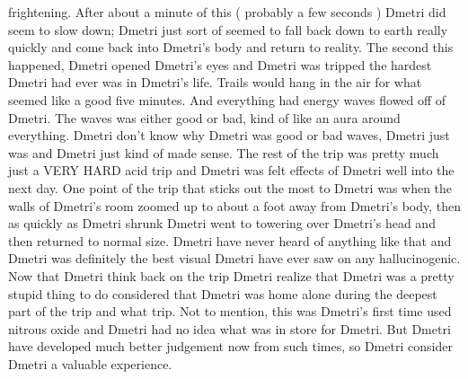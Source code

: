 \documentclass[12pt]{book}
\begin{document}
frightening. After about a minute of this ( probably a few seconds ) Dmetri did seem to slow down; Dmetri just sort of seemed to fall back down to earth really quickly and come back into Dmetri's body and return to reality. The second this happened, Dmetri opened Dmetri's eyes and Dmetri was tripped the hardest Dmetri had ever was in Dmetri's life. Trails would hang in the air for what seemed like a good five minutes. And everything had energy waves flowed off of Dmetri. The waves was either good or bad, kind of like an aura around everything. Dmetri don't know why Dmetri was good or bad waves, Dmetri just was and Dmetri just kind of made sense. The rest of the trip was pretty much just a VERY HARD acid trip and Dmetri was felt effects of Dmetri well into the next day. One point of the trip that sticks out the most to Dmetri was when the walls of Dmetri's room zoomed up to about a foot away from Dmetri's body, then as quickly as Dmetri shrunk Dmetri went to towering over Dmetri's head and then returned to normal size. Dmetri have never heard of anything like that and Dmetri was definitely the best visual Dmetri have ever saw on any hallucinogenic. Now that Dmetri think back on the trip Dmetri realize that Dmetri was a pretty stupid thing to do considered that Dmetri was home alone during the deepest part of the trip and what trip. Not to mention, this was Dmetri's first time used nitrous oxide and Dmetri had no idea what was in store for Dmetri. But Dmetri have developed much better judgement now from such times, so Dmetri consider Dmetri a valuable experience.
\end{document}
